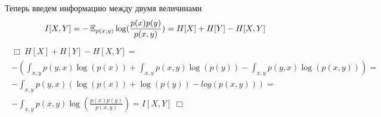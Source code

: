 Теперь введем информацию между двумя величинами
\begin{gather}
\begin{aligned}
    I[X, Y] = - \operatorname{\mathbb{E}}_{p(x, y)}\log(\frac{p(x)p(y)}{p(x, y)}) = H[X] + H[Y] - H[X, Y]
\end{aligned}
\end{gather}    
\begin{gather}
\begin{aligned}
    \Box \: H[X] + H[Y] - H[X, Y] = \\ 
    - (\int_{x, y}p(y, x)\log(p(x)) + \int_{x, y}p(x, y)\log(p(y)) - \int_{x, y}p(y, x)\log(p(x, y))) = \\
    - \int_{x, y}p(y, x) (\log(p(x)) + \log(p(y)) - log(p(x, y))) = \\
    - \int_{x, y}p(x, y)\log(\frac{p(x)p(y)}{p(x, y)}) = I[X, Y] \:\Box 
\end{aligned}
\end{gather}    
